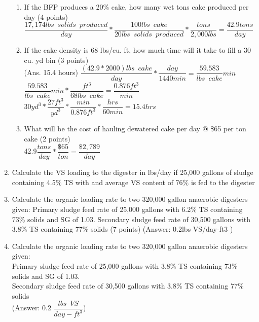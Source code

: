 \begin{enumerate}
\begin{enumerate}
\item If the BFP produces a 20\% cake, how many wet tons cake produced per day (4 points)\\
$\dfrac{17,174 lbs \enspace solids \enspace produced}{day}*\dfrac{100 lbs \enspace cake}{20 lbs \enspace solids \enspace produced}*\dfrac{tons}{2,000 lbs}=\boxed{\dfrac{42.9tons}{day}}$
\vspace{2cm}

\item If the cake density is 68 lbs/cu. ft, how much time will it take to fill a 30 cu. yd bin (3 points)\\
(Ans. 15.4 hours)
$\dfrac{(42.9*2000)lbs \enspace cake}{day}*\dfrac{day}{1440 min}=\dfrac{59.583}{lbs \enspace cake}{min}$\\
$\dfrac{59.583}{lbs \enspace cake}{min}*\dfrac{ft^3}{68 lbs \enspace cake}=\dfrac{0.876ft^3}{min}$\\
$30yd^3*\dfrac{27ft^3}{yd^3}*\dfrac{min}{0.876ft^3}*\dfrac{hrs}{60 min}=\boxed{15.4hrs}$
\vspace{2cm}
\item What will be the cost of hauling dewatered cake per day @ \$65 per ton cake (2 points)\\
42.9$\dfrac{tons}{day}*\dfrac{\$65}{ton}=\boxed{\dfrac{\$2,789}{day}}$ 
\end{enumerate}

\item Calculate the VS loading to the digester in lbs/day if 25,000 gallons of sludge containing 4.5\% TS with and average VS content of 76\% is fed to the digester 


\item Calculate the organic loading rate to two 320,000 gallon anaerobic digesters given:
Primary sludge feed rate of 25,000 gallons with 6.2\% TS containing 73\% solids and SG of 1.03.
Secondary sludge feed rate of 30,500 gallons with 3.8\% TS containing 77\% solids (7 points)
(Answer: 0.2lbs VS/day-ft3 ) 



\item Calculate the organic loading rate to two 320,000 gallon anaerobic digesters given:\\
Primary sludge feed rate of 25,000 gallons with 3.8\% TS containing 73\% solids and SG of 1.03.\\
Secondary sludge feed rate of 30,500 gallons with 3.8\% TS containing 77\% solids 
\\
(Answer: 0.2 $\dfrac{lbs \enspace VS}{day-ft^3}$)\\
\vspace{1cm}




\end{enumerate}
